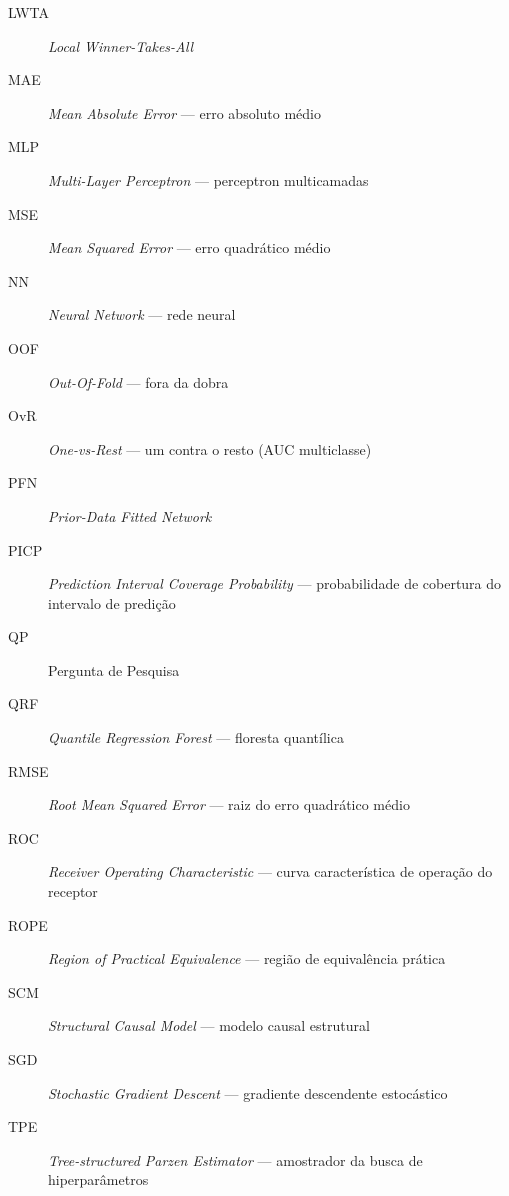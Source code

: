 \begin{description}
  \item[LWTA] \emph{Local Winner-Takes-All}
  \item[MAE] \emph{Mean Absolute Error} --- erro absoluto médio
  \item[MLP] \emph{Multi-Layer Perceptron} --- perceptron multicamadas
  \item[MSE] \emph{Mean Squared Error} --- erro quadrático médio
  \item[NN] \emph{Neural Network} --- rede neural
  \item[OOF] \emph{Out-Of-Fold} --- fora da dobra
  \item[OvR] \emph{One-vs-Rest} --- um contra o resto (AUC multiclasse)
  \item[PFN] \emph{Prior-Data Fitted Network}
  \item[PICP] \emph{Prediction Interval Coverage Probability} --- probabilidade de cobertura do intervalo de predição
  \item[QP] Pergunta de Pesquisa
  \item[QRF] \emph{Quantile Regression Forest} --- floresta quantílica
  \item[RMSE] \emph{Root Mean Squared Error} --- raiz do erro quadrático médio
  \item[ROC] \emph{Receiver Operating Characteristic} --- curva característica de operação do receptor
  \item[ROPE] \emph{Region of Practical Equivalence} --- região de equivalência prática
  \item[SCM] \emph{Structural Causal Model} --- modelo causal estrutural
  \item[SGD] \emph{Stochastic Gradient Descent} --- gradiente descendente estocástico
  \item[TPE] \emph{Tree-structured Parzen Estimator} --- amostrador da busca de hiperparâmetros
\end{description}
\cleardoublepage
